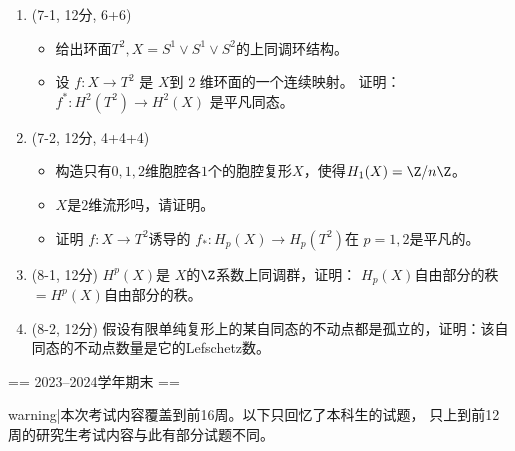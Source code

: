 \begin{enumerate}
    \item (7-1, 12分, 6+6) 
    \begin{itemize}
        \item [(1)] 给出环面$T^2,X=S^1\vee S^1\vee  S^2$的上同调环结构。
        \item [(2)] 设 $f: X \longrightarrow T^{2}$ 是 $X$到 $2$ 维环面的一个连续映射。
        证明： $f^{*}: H^{2}(T^{2}) \longrightarrow H^{2}(X)$ 是平凡同态。
    \end{itemize}
    
    \item (7-2, 12分, 4+4+4)
    \begin{itemize}
        \item [(1)] 构造只有$0,1,2$维胞腔各$1$个的胞腔复形$X$，使得$H_1(X)=\Z/n\Z$。
        \item [(2)] $X$是$2$维流形吗，请证明。
        \item [(3)] 证明 $f:X\to T^2$诱导的 $f_*:H_p(X)\to H_p(T^2)$在 $p=1,2$是平凡的。
    \end{itemize}

    \item (8-1, 12分) $H^p(X)$是 $X$的$\Z$系数上同调群，证明： $H_p(X)$自由部分的秩$=H^p(X)$自由部分的秩。
    \item (8-2, 12分) 假设有限单纯复形上的某自同态的不动点都是孤立的，证明：该自同态的不动点数量是它的Lefschetz数。
\end{enumerate}


== 2023--2024学年期末 ==

{{warning|本次考试内容覆盖到前16周。以下只回忆了本科生的试题，
只上到前12周的研究生考试内容与此有部分试题不同。}}

